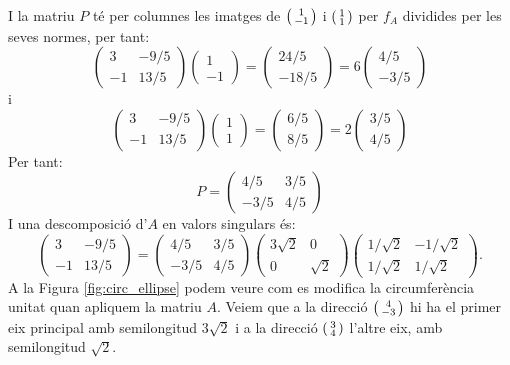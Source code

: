 \begin{exemple}
I la matriu $P$ té per columnes les imatges de $\left(\begin{smallmatrix}1\\-1\end{smallmatrix}\right)$ i $\left(\begin{smallmatrix}1\\1\end{smallmatrix}\right)$ per $f_A$ dividides per les seves normes, per tant:
\[
\begin{pmatrix}
3 & -9/5 \\ -1 & 13/5
\end{pmatrix} 
\begin{pmatrix}
1 \\ -1 
\end{pmatrix}=
\begin{pmatrix}
24/5 \\ -18/5
\end{pmatrix}=
6 \begin{pmatrix}
4/5 \\ -3/5
\end{pmatrix}
\]
i
\[
\begin{pmatrix}
3 & -9/5 \\ -1 & 13/5
\end{pmatrix} 
\begin{pmatrix}
1 \\ 1 
\end{pmatrix}=
\begin{pmatrix}
6/5 \\ 8/5
\end{pmatrix}=
2 \begin{pmatrix}
3/5 \\ 4/5
\end{pmatrix}
\]
Per tant:
\[
P=\begin{pmatrix}
4/5 & 3/5 \\ -3/5 & 4/5
\end{pmatrix}
\]
I una descomposició d'$A$ en valors singulars és:
\[
\begin{pmatrix}
3 & -9/5 \\ -1 & 13/5
\end{pmatrix} 
=\begin{pmatrix}
4/5 & 3/5 \\ -3/5 & 4/5
\end{pmatrix} 
\begin{pmatrix}
3\sqrt{2} & 0 \\ 0 & \sqrt{2}
\end{pmatrix}
\begin{pmatrix}
1/\sqrt{2} & -1/\sqrt{2} \\ 1/\sqrt{2} & 1/\sqrt{2}
\end{pmatrix}.
\]
A la Figura \ref{fig:circ_ellipse} podem veure com es modifica la circumferència unitat quan apliquem la matriu $A$. Veiem que a la direcció $\left(\begin{smallmatrix}4\\-3\end{smallmatrix}\right)$ hi ha el primer eix principal amb semilongitud $3\sqrt{2}$ i a la direcció $\left(\begin{smallmatrix}3\\4\end{smallmatrix}\right)$ l'altre eix, amb semilongitud $\sqrt{2}$.

\end{exemple}
